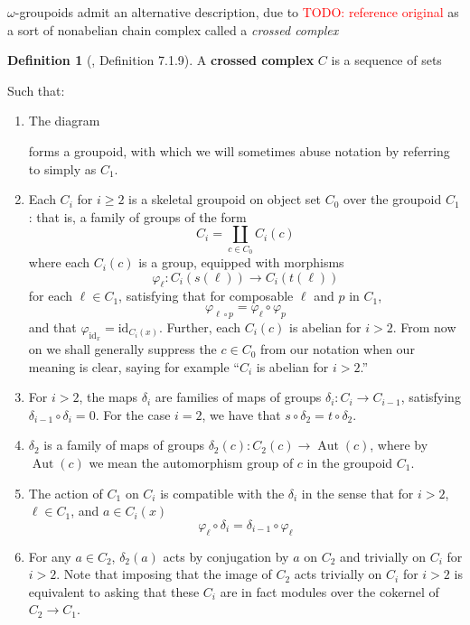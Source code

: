 \documentclass[12pt]{article}
\theoremstyle{definition}
\newtheorem{definition}[theorem]{Definition}
\newcommand{\TODO}[1]{\textcolor{red}{TODO: {#1}}}
\renewcommand{\phi}{\varphi}
\newcommand{\id}{\text{id}}
\DeclareMathOperator{\Aut}{Aut}
\begin{document}
	$\omega$-groupoids admit an alternative description, due to \TODO{reference original} as a sort of nonabelian chain complex called a \textit{crossed complex}
	\begin{definition}[\cite{Brown_Higgins_Sivera_2011}, Definition 7.1.9]
	A \textbf{crossed complex} $C$ is a sequence of sets 
	\begin{center}
	\end{center}
	Such that:
	\begin{enumerate}
		\item The diagram
	\begin{center}
	\end{center}
	forms a groupoid, with which we will sometimes abuse notation by referring to simply as $C_1$.
	\item Each $C_i$ for $i \ge 2$ is a skeletal groupoid on object set $C_0$ over the groupoid $C_1$: that is, a family of groups of the form 
	$$C_i = \coprod_{c \in C_0} C_i(c)$$
	where each $C_i(c)$ is a group, equipped with morphisms
	$$
	\phi_\ell: C_i(s(\ell)) \to C_i(t(\ell))
	$$
	for each $\ell \in C_1$, satisfying that for composable $\ell$ and $p$ in $C_1$, 
	$$
	\phi_{\ell \circ p} = \phi_\ell \circ \phi_p
	$$
	and that $\phi_{\id_x} = \id_{C_i(x)}$. Further, each $C_i(c)$ is abelian for $i>2$. From now on we shall generally suppress the $ c \in C_0$ from our notation when our meaning is clear, saying for example ``$C_i$ is abelian for $i > 2$.''
	\item For $i > 2$, the maps $\delta_i$ are families of maps of groups $\delta_i : C_i \to C_{i-1}$, satisfying $\delta_{i-1} \circ \delta_i = 0$. For the case $i=2$, we have that $s\circ \delta_2 = t\circ \delta_2$.
	\item $\delta_2$ is a family of maps of groups $\delta_2(c) : C_2(c) \to \Aut(c)$, where by $\Aut(c)$ we mean the automorphism group of $c$ in the groupoid $C_1$.
	\item The action of $C_1$ on $C_i$ is compatible with the $\delta_i$ in the sense that for $i > 2$, $\ell \in C_1$, and $a \in C_i(x)$
	$$\phi_\ell \circ \delta_i = \delta_{i-1} \circ \phi_\ell$$
	\item For any $a \in C_2$, $\delta_2(a)$ acts by conjugation by $a$ on $C_2$ and trivially on $C_i$ for $i > 2$. 
	Note that imposing that the image of $C_2$ acts trivially on $C_i$ for $i > 2$ is equivalent to asking that these $C_i$ are in fact modules over the cokernel of $C_2 \to C_1$.
	\end{enumerate}
	\end{definition}
\end{document}
